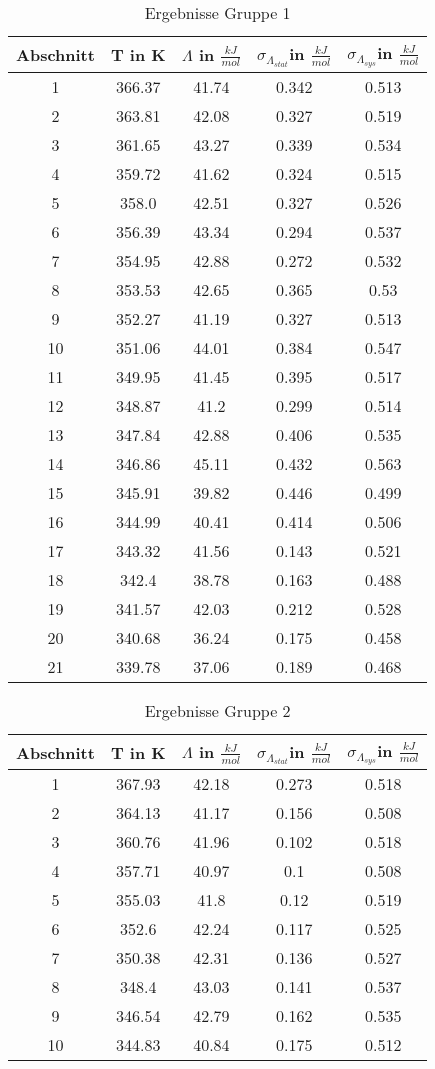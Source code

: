 \documentclass{article}
\begin{document}
\begin{table}[H]\centering
\caption{Ergebnisse Gruppe 1}

\begin{tabular}{c|c|c|c|c}
Abschnitt&T in K&$\Lambda$ in $\frac{kJ}{mol}$&$\sigma_{\Lambda_{stat}}$in $\frac{kJ}{mol}$&$\sigma_{\Lambda_{sys}}$in $\frac{kJ}{mol}$\\
\hline
1&366.37&41.74&0.342&0.513\\
2&363.81&42.08&0.327&0.519\\
3&361.65&43.27&0.339&0.534\\
4&359.72&41.62&0.324&0.515\\
5&358.0&42.51&0.327&0.526\\
6&356.39&43.34&0.294&0.537\\
7&354.95&42.88&0.272&0.532\\
8&353.53&42.65&0.365&0.53\\
9&352.27&41.19&0.327&0.513\\
10&351.06&44.01&0.384&0.547\\
11&349.95&41.45&0.395&0.517\\
12&348.87&41.2&0.299&0.514\\
13&347.84&42.88&0.406&0.535\\
14&346.86&45.11&0.432&0.563\\
15&345.91&39.82&0.446&0.499\\
16&344.99&40.41&0.414&0.506\\
17&343.32&41.56&0.143&0.521\\
18&342.4&38.78&0.163&0.488\\
19&341.57&42.03&0.212&0.528\\
20&340.68&36.24&0.175&0.458\\
21&339.78&37.06&0.189&0.468\\
\end{tabular}
\end{table}
\begin{table}[H]\centering
\caption{Ergebnisse Gruppe 2}
\begin{tabular}{c|c|c|c|c}
Abschnitt&T in K&$\Lambda$ in $\frac{kJ}{mol}$&$\sigma_{\Lambda_{stat}}$in $\frac{kJ}{mol}$&$\sigma_{\Lambda_{sys}}$in $\frac{kJ}{mol}$\\
\hline
1&367.93&42.18&0.273&0.518\\
2&364.13&41.17&0.156&0.508\\
3&360.76&41.96&0.102&0.518\\
4&357.71&40.97&0.1&0.508\\
5&355.03&41.8&0.12&0.519\\
6&352.6&42.24&0.117&0.525\\
7&350.38&42.31&0.136&0.527\\
8&348.4&43.03&0.141&0.537\\
9&346.54&42.79&0.162&0.535\\
10&344.83&40.84&0.175&0.512\\
\end{tabular}
\end{table}
\end{document}
